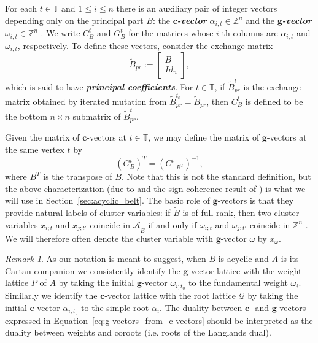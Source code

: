 \documentclass[12pt]{amsart}
\newcommand{\newword}[1]{\textbf{\emph{#1}}}
\newcommand{\cA}{\mathcal{A}}
\newcommand{\TT}{\mathbb{T}}
\newcommand{\ZZ}{\mathbb{Z}}
\newcommand{\bfc}{\mathbf{c}}
\newcommand{\bfg}{\mathbf{g}}
\newcommand{\cv}{\alpha}
\newcommand{\gv}{\omega}
\newcommand{\cQ}{\mathcal{Q}}
\newcommand{\Bpr}{\widetilde{B}_{pr}}
\theoremstyle{remark}
\newtheorem{remark}[theorem]{Remark}
\numberwithin{equation}{section}
\numberwithin{figure}{section}
\begin{document}
For each $t \in\TT$ and $1 \leq i \leq n$ there is an auxiliary pair of integer vectors depending only on the principal part $B$: the \newword{$\bfc$-vector} $\cv_{i;t} \in \ZZ^n$ and the \newword{$\bfg$-vector} $\gv_{i;t} \in \ZZ^n$ \cite{FZ07}.
We write $C_B^t$ and $G_B^t$ for the matrices whose $i$-th columns are $\cv_{i;t}$ and $\gv_{i;t}$, respectively.
To define these vectors, consider the exchange matrix $$\Bpr := \begin{bmatrix} B \\ Id_n \end{bmatrix},$$ which is said to have \newword{principal coefficients}.
For $t\in\TT$, if $\Bpr^t$ is the exchange matrix obtained by iterated mutation from $\Bpr^{t_0}=\Bpr$, then $C_B^t$ is defined to be the bottom $n \times n$ submatrix of $\Bpr^t$.

Given the matrix of $\bfc$-vectors at $t\in\TT$, we may define the matrix of $\bfg$-vectors at the same vertex $t$ by
\begin{equation}
  \label{eq:g-vectors_from_c-vectors}
  (G_B^t)^T = (C^t_{-B^T})^{-1},
\end{equation}
where $B^T$ is the transpose of $B$.
Note that this is not the standard definition, but the above characterization (due to \cite[Theorem 1.2]{NZ12} and the sign-coherence result of \cite{DWZ10,GHKK14}) is what we will use in Section~\ref{sec:acyclic_belt}.
The basic role of $\bfg$-vectors is that they provide natural labels of cluster variables: if $\widetilde{B}$ is of full rank, then two cluster variables $x_{i;t}$ and $x_{j;t'}$ coincide in $\cA_{\widetilde B}$ if and only if $\gv_{i;t}$ and $\gv_{j;t'}$ coincide in $\ZZ^n$ \cite{DWZ10,GHKK14}.
We will therefore often denote the cluster variable with $\bfg$-vector $\gv$ by $x_\gv$.

\begin{remark}
  \label{rem:cgrootsweights}
  As our notation is meant to suggest, when $B$ is acyclic and $A$ is its Cartan companion we consistently identify the $\bfg$-vector lattice with the weight lattice $P$ of $A$ by taking the initial $\bfg$-vector $\gv_{i;t_0}$ to the fundamental weight $\omega_i$.
  Similarly we identify the $\bfc$-vector lattice with the root lattice $\cQ$ by taking the initial $\bfc$-vector $\cv_{i;t_0}$ to the simple root $\alpha_i$.
  The duality between $\bfc$- and $\bfg$-vectors expressed in Equation~\eqref{eq:g-vectors_from_c-vectors} should be interpreted as the duality between weights and coroots (i.e. roots of the Langlands dual).
\end{remark}
\end{document}
